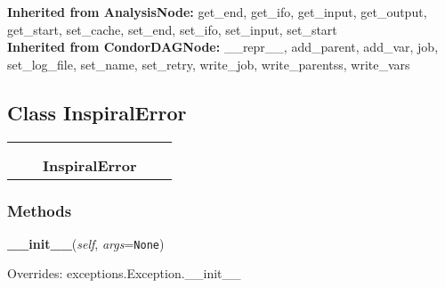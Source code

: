   \textbf{Inherited from AnalysisNode:}
    get\_end,
    get\_ifo,
    get\_input,
    get\_output,
    get\_start,
    set\_cache,
    set\_end,
    set\_ifo,
    set\_input,
    set\_start
    \\
  \textbf{Inherited from CondorDAGNode:}
    \_\_repr\_\_,
    add\_parent,
    add\_var,
    job,
    set\_log\_file,
    set\_name,
    set\_retry,
    write\_job,
    write\_parentss,
    write\_vars


\subsection{Class InspiralError}

    \label{inspiral:InspiralError}
\begin{tabular}{cccccc}
\multicolumn{2}{r}{\settowidth{\BCL}{exceptions.Exception}\multirow{2}{\BCL}{exceptions.Exception}}
&&
  \\\cline{3-3}
  &&\multicolumn{1}{c|}{}
&&
  \\
&&\multicolumn{2}{l}{\textbf{InspiralError}}
\end{tabular}



  \subsubsection{Methods}

    \label{inspiral:InspiralError:__init__}
    \vspace{0.5ex}

    \noindent\begin{boxedminipage}{\textwidth}

    \raggedright \textbf{\_\_init\_\_}(\textit{self}, \textit{args}=\texttt{N\-o\-n\-e\-})

      Overrides: exceptions.Exception.\_\_init\_\_

    \end{boxedminipage}

